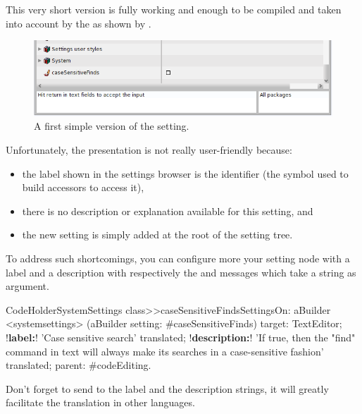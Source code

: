 \documentclass[a4paper,10pt,twoside]{book}
\begin{document}
This very short version is fully working and enough to be compiled and taken into account by the \setbrowser as shown by .

\begin{figure}[tbh]
\begin{center}
\includegraphics[scale=0.4]{caseSensitiveFinds_setting_declaration2}
\caption{A first simple version of the  setting.}
\end{center}
\end{figure}


Unfortunately, the presentation is not really user-friendly because:
\begin{itemize}
\item the label shown in the settings browser is the identifier (the symbol used to build accessors to access it),
\item there is no description or explanation available for this setting, and
\item the new setting is simply added at the root of the setting tree. 
\end{itemize}

To address such shortcomings, you can configure more your setting node with a label and a description with respectively the  and  messages which take a string as argument. 
\begin{code}{}
CodeHolderSystemSettings class>>caseSensitiveFindsSettingsOn: aBuilder
	<systemsettings>
	(aBuilder setting: #caseSensitiveFinds) 
		target: TextEditor;
		!\textbf{label:}! 'Case sensitive search' translated;
		!\textbf{description:}! 'If true, then the "find" command in text will always make its searches in a case-sensitive fashion' translated;
		parent: #codeEditing.
\end{code}

Don't forget to send  to the label and the description strings, it will greatly facilitate the translation in other languages.
\end{document}
